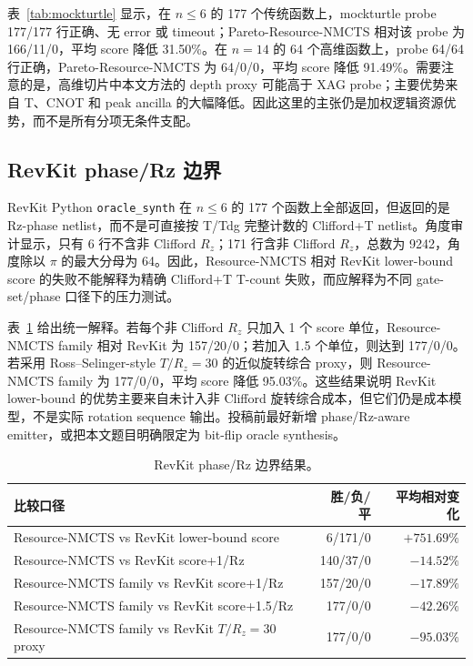 \documentclass[UTF8,fontset=macnew,11pt]{ctexart}
\newcommand{\method}{Resource-NMCTS}
\newcommand{\rz}{\ensuremath{R_z}}
\begin{document}
表~\ref{tab:mockturtle} 显示，在 $n\leq6$ 的 177 个传统函数上，mockturtle probe 177/177 行正确、无 error 或 timeout；Pareto-\method{} 相对该 probe 为 166/11/0，平均 score 降低 31.50\%。在 $n=14$ 的 64 个高维函数上，probe 64/64 行正确，Pareto-\method{} 为 64/0/0，平均 score 降低 91.49\%。需要注意的是，高维切片中本文方法的 depth proxy 可能高于 XAG probe；主要优势来自 T、CNOT 和 peak ancilla 的大幅降低。因此这里的主张仍是加权逻辑资源优势，而不是所有分项无条件支配。

\subsection{RevKit phase/Rz 边界}

RevKit Python \texttt{oracle\_synth} 在 $n\leq6$ 的 177 个函数上全部返回，但返回的是 Rz-phase netlist，而不是可直接按 T/Tdg 完整计数的 Clifford+T netlist。角度审计显示，只有 6 行不含非 Clifford \rz{}；171 行含非 Clifford \rz{}，总数为 9242，角度除以 $\pi$ 的最大分母为 64。因此，\method{} 相对 RevKit lower-bound score 的失败不能解释为精确 Clifford+T T-count 失败，而应解释为不同 gate-set/phase 口径下的压力测试。

表~\ref{tab:rz-boundary} 给出统一解释。若每个非 Clifford \rz{} 只加入 1 个 score 单位，Resource-NMCTS family 相对 RevKit 为 157/20/0；若加入 1.5 个单位，则达到 177/0/0。若采用 Ross--Selinger-style $T/R_z=30$ 的近似旋转综合 proxy，则 Resource-NMCTS family 为 177/0/0，平均 score 降低 95.03\%。这些结果说明 RevKit lower-bound 的优势主要来自未计入非 Clifford 旋转综合成本，但它们仍是成本模型，不是实际 rotation sequence 输出。投稿前最好新增 phase/Rz-aware emitter，或把本文题目明确限定为 bit-flip oracle synthesis。

\begin{table}[H]
\centering
\small
\caption{RevKit phase/Rz 边界结果。}
\label{tab:rz-boundary}
\begin{tabularx}{\linewidth}{>{\raggedright\arraybackslash}Xrr}
\toprule
比较口径 & 胜/负/平 & 平均相对变化 \\
\midrule
\method{} vs RevKit lower-bound score & 6/171/0 & $+751.69\%$ \\
\method{} vs RevKit score+1/Rz & 140/37/0 & $-14.52\%$ \\
Resource-NMCTS family vs RevKit score+1/Rz & 157/20/0 & $-17.89\%$ \\
Resource-NMCTS family vs RevKit score+1.5/Rz & 177/0/0 & $-42.26\%$ \\
Resource-NMCTS family vs RevKit $T/R_z=30$ proxy & 177/0/0 & $-95.03\%$ \\
\bottomrule
\end{tabularx}
\end{table}
\end{document}
